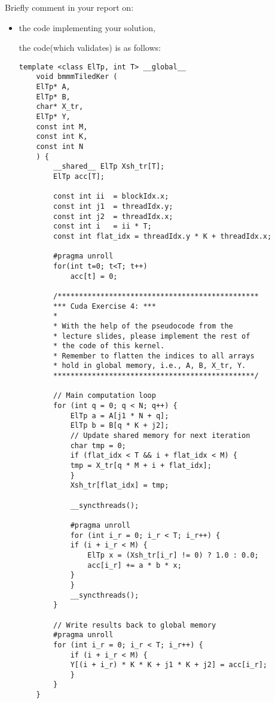 \documentclass{article}
\begin{document}
Briefly comment in your report on:

\begin{itemize}
    \item the code implementing your solution,
    
    the code(which validates) is as follows:
    
    \begin{lstlisting}[language=cuda]
    template <class ElTp, int T> __global__
    void bmmmTiledKer ( 
    ElTp* A,      
    ElTp* B, 
    char* X_tr,  
    ElTp* Y,
    const int M, 
    const int K, 
    const int N
    ) {
        __shared__ ElTp Xsh_tr[T];
        ElTp acc[T];

        const int ii  = blockIdx.x;
        const int j1  = threadIdx.y;
        const int j2  = threadIdx.x;
        const int i   = ii * T;
        const int flat_idx = threadIdx.y * K + threadIdx.x;

        #pragma unroll
        for(int t=0; t<T; t++)
            acc[t] = 0;

        /***********************************************
        *** Cuda Exercise 4: ***
        * 
        * With the help of the pseudocode from the
        * lecture slides, please implement the rest of
        * the code of this kernel.
        * Remember to flatten the indices to all arrays
        * hold in global memory, i.e., A, B, X_tr, Y.
        ***********************************************/

        // Main computation loop
        for (int q = 0; q < N; q++) {
            ElTp a = A[j1 * N + q];
            ElTp b = B[q * K + j2];
            // Update shared memory for next iteration
            char tmp = 0;
            if (flat_idx < T && i + flat_idx < M) {
            tmp = X_tr[q * M + i + flat_idx];
            }
            Xsh_tr[flat_idx] = tmp;

            __syncthreads();

            #pragma unroll
            for (int i_r = 0; i_r < T; i_r++) {
            if (i + i_r < M) {
                ElTp x = (Xsh_tr[i_r] != 0) ? 1.0 : 0.0;
                acc[i_r] += a * b * x;
            }
            }
            __syncthreads();
        }

        // Write results back to global memory
        #pragma unroll
        for (int i_r = 0; i_r < T; i_r++) {
            if (i + i_r < M) {
            Y[(i + i_r) * K * K + j1 * K + j2] = acc[i_r];
            }
        }
    }
    \end{lstlisting}


\end{itemize}
\end{document}
